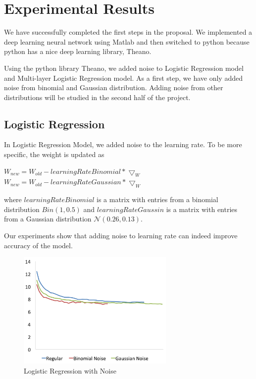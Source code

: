 \section{Experimental Results}
\label{sec:result}

We have successfully completed the first steps in the proposal.
We implemented a deep learning neural network using Matlab and then
switched to python because python has a nice deep learning library,
Theano.

Using the python library Theano, we added noise to Logistic Regression
model and Multi-layer Logistic Regression model.
As a first step, we have only added noise from binomial and Gaussian
distribution. Adding noise from other distributions will be studied in
the second half of the project.

\subsection{Logistic Regression}
In Logistic Regression Model, we added noise to the learning rate.
To be more specific, the weight is updated as

\begin{center}
$W_{new} = W_{old} - learningRateBinomial * \bigtriangledown_{W}$
$W_{new} = W_{old} - learningRateGaussian * \bigtriangledown_{W}$
\end{center}

where $learningRateBinomial$ is a matrix with entries from a binomial
distribution $Bin(1,0.5)$ and $learningRateGaussin$ is a matrix with entries
from a Gaussian distribution $\mathcal{N}(0.26,0.13)$.

Our experiments show that adding noise to learning rate can indeed
improve accuracy of the model.

\begin{figure}[h]
\centering
\includegraphics[width=215pt]{figs/logistic_sgd_all.png}
\caption{Logistic Regression with Noise}
\label{fig:logistic-sgd}
\end{figure}

